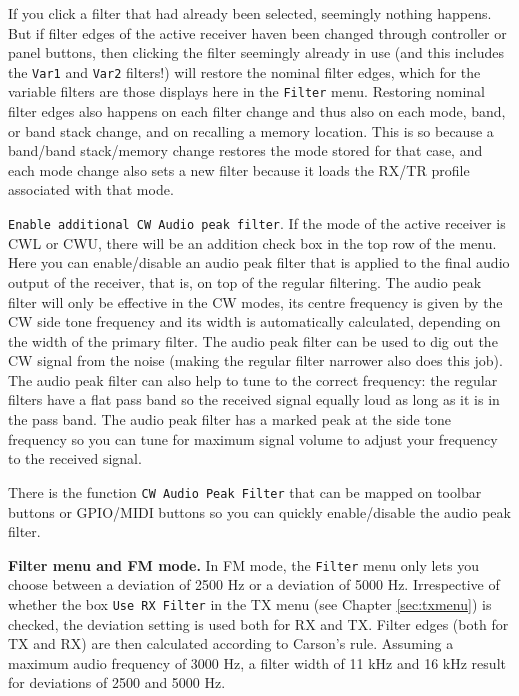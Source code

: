 \documentclass[12pt]{book}
\def\rett#1{\texttt{\color{red}#1}}
\def\bltt#1{\texttt{\color{blue}#1}}
\begin{document}
If you click a filter that had already been selected, seemingly nothing happens.
But if filter edges of the active receiver haven been changed through
controller or panel buttons, then clicking the filter seemingly already in use
(and this includes the \texttt{Var1} and \texttt{Var2} filters!)
will restore the nominal filter edges, which for the variable filters are those
displays here in the \bltt{Filter} menu.
Restoring nominal filter edges also happens on each filter change and thus
also on each  mode, band, or band stack change, and on recalling a memory
location. This is so because a band/band stack/memory change restores
the mode stored for that case, and each mode change also sets a new filter
because it loads the RX/TR profile associated with that mode.

\rett{Enable additional CW Audio peak filter}. If the mode of the
active receiver is CWL or CWU, there will be an addition check box in the
top row of the menu. Here you can enable/disable an audio peak filter that
is applied to the final audio output of the receiver, that is, on top of
the regular filtering. The audio peak filter will only be effective in
the CW modes, its centre frequency is given by the CW side tone frequency
and its width is automatically calculated, depending on the
width of the primary filter. The audio peak filter can be used to dig out
the CW signal from the noise (making the regular filter narrower also
does this job). The audio peak filter can also help to tune to the correct
frequency: the regular filters have a flat pass band so the received
signal equally loud as long as it is in the pass band. The audio peak filter
has a marked peak at the side tone frequency so you can tune for maximum
signal volume to adjust your frequency to the received signal.

There is the function \bltt{CW Audio Peak Filter} that can be mapped on toolbar
buttons or GPIO/MIDI buttons so you can quickly enable/disable the audio peak
filter.

\textbf{Filter menu and FM mode.} In FM mode, the \bltt{Filter} menu only lets you
choose between a deviation of 2500 Hz or a deviation of 5000 Hz.
Irrespective of whether the box \rett{Use RX Filter} in the TX menu (see
Chapter \ref{sec:txmenu}) is checked, the deviation setting is used both for RX and TX.
Filter edges (both for
TX and RX) are then calculated according to Carson's rule. Assuming a maximum audio
frequency of 3000 Hz, a filter width of 11 kHz and 16 kHz result for deviations of 2500
and 5000 Hz.
\end{document}
